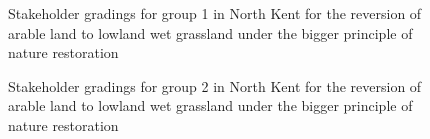 \documentclass[
  12pt,
  letterpaper,
  DIV=11,
  numbers=noendperiod]{scrartcl}
\begin{document}
\begin{figure}[H]


\caption{\label{fig-NKArBigG1}Stakeholder gradings for group 1 in North
Kent for the reversion of arable land to lowland wet grassland under the
bigger principle of nature restoration}

\end{figure}%

\begin{figure}[H]


\caption{\label{fig-NKArBigG2}Stakeholder gradings for group 2 in North
Kent for the reversion of arable land to lowland wet grassland under the
bigger principle of nature restoration}

\end{figure}%
\end{document}
